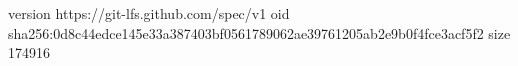 version https://git-lfs.github.com/spec/v1
oid sha256:0d8c44edce145e33a387403bf0561789062ae39761205ab2e9b0f4fce3acf5f2
size 174916

